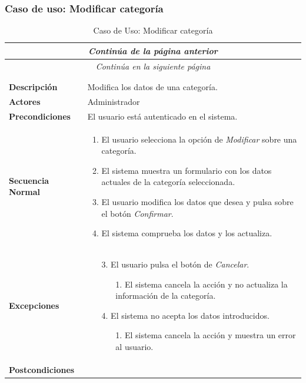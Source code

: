 \newpage
\subsubsection*{Caso de uso: Modificar categoría }
\begin{longtable}{| p{4cm} | p{10cm} |}
\endfirsthead
\multicolumn{2}{c}{\textit{Continúa de la página anterior}}\\[12pt]
\hline
\endhead
\hline
\multicolumn{2}{c}{\textit{Continúa en la siguiente página}} \\
\endfoot
\hline
\caption{Caso de Uso: Modificar categoría}\label{fig:1}\\
\endlastfoot


\hline
\multicolumn{2}{|c|}{\textbf{CU$<$43$>$ - Modificar Categoría}} \\

\hline
\textbf{Descripción} &
Modifica los datos de una categoría.\\

\hline
\textbf{Actores} &
Administrador\\

\hline
\textbf{Precondiciones} &
El usuario está autenticado en el sistema.\\

\hline
\textbf{Secuencia Normal} &\mbox{}\par\vspace{-\baselineskip}
\begin{enumerate}[leftmargin=0.7cm, topsep=0.1cm]
\item El usuario selecciona la opción de \textit{Modificar} sobre una categoría.
\item El sistema muestra un formulario con los datos actuales de la categoría seleccionada.
\item El usuario modifica los datos que desea y pulsa sobre el botón \textit{Confirmar}.
\item El sistema comprueba los datos y los actualiza.
\end{enumerate}


\\
\hline
\textbf{Excepciones} &\mbox{}\par\vspace{-\baselineskip}
\begin{enumerate}[leftmargin=0.9cm, topsep=0.1cm]
\item[3.] El usuario pulsa el botón de \textit{Cancelar}.
	\begin{itemize}
	\item[1.] El sistema cancela la acción y no actualiza la información de la categoría.
	\end{itemize}
\item[4.] El sistema no acepta los datos introducidos.
	\begin{itemize}
	\item[1.] El sistema cancela la acción y muestra un error al usuario.
	\end{itemize}
\end{enumerate}
\\

\hline
\textbf{Postcondiciones} & \\
\hline
\end{longtable}
